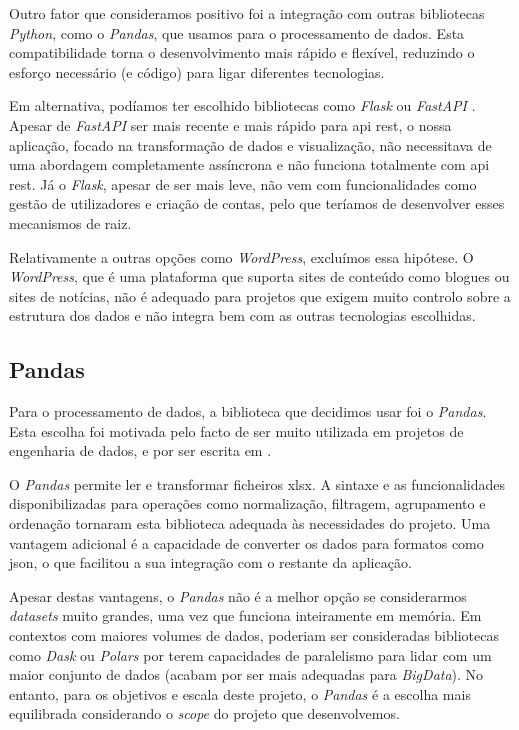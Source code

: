 Outro fator que consideramos positivo foi a integração com outras bibliotecas \textit{Python}, como o \textit{Pandas}, que usamos para o processamento de dados. Esta compatibilidade torna o desenvolvimento mais rápido e flexível, reduzindo o esforço necessário (e código) para ligar diferentes tecnologias.

Em alternativa, podíamos ter escolhido bibliotecas como \textit{Flask} \cite{grinberg2018flask} ou \textit{FastAPI} \cite{tiangolo2018fastapi}. Apesar de \textit{FastAPI} ser mais recente e mais rápido para \gls{api} \gls{rest}, o nossa aplicação, focado na transformação de dados e visualização, não necessitava de uma abordagem completamente assíncrona e não funciona totalmente com \gls{api} \gls{rest}. Já o \textit{Flask}, apesar de ser mais leve, não vem com funcionalidades como gestão de utilizadores e criação de contas, pelo que teríamos de desenvolver esses mecanismos de raiz.

Relativamente a outras opções como \textit{WordPress}, excluímos essa hipótese. O \textit{WordPress}, que é uma plataforma que suporta sites de conteúdo como blogues ou sites de notícias, não é adequado para projetos que exigem muito controlo sobre a estrutura dos dados e não integra bem com as outras tecnologias escolhidas.

\subsection{Pandas}

Para o processamento de dados, a biblioteca que decidimos usar foi o \textit{Pandas}. Esta escolha foi motivada pelo facto de ser muito utilizada em projetos de engenharia de dados, e por ser escrita em .

O \textit{Pandas} permite ler e transformar ficheiros \gls{xlsx}. A sintaxe e as funcionalidades disponibilizadas para operações como normalização, filtragem, agrupamento e ordenação tornaram esta biblioteca adequada às necessidades do projeto. Uma vantagem adicional é a capacidade de converter os dados para formatos como \gls{json}, o que facilitou a sua integração com o restante da aplicação.

Apesar destas vantagens, o \textit{Pandas} não é a melhor opção se considerarmos \textit{datasets} muito grandes, uma vez que funciona inteiramente em memória. Em contextos com maiores volumes de dados, poderiam ser consideradas bibliotecas como \textit{Dask} ou \textit{Polars} por terem capacidades de paralelismo para lidar com um maior conjunto de dados (acabam por ser mais adequadas para \textit{BigData}). No entanto, para os objetivos e escala deste projeto, o \textit{Pandas} é a escolha mais equilibrada considerando o \textit{scope} do projeto que desenvolvemos.

